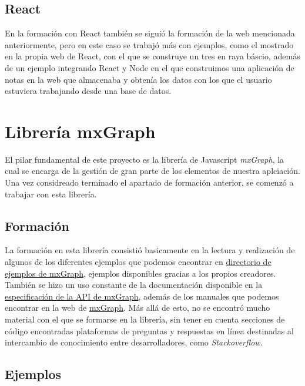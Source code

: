 \subsection{React}

En la formación con React también se siguió la formación de la web mencionada anteriormente, pero en este caso se trabajó más con ejemplos, como el mostrado en la propia web de React, con el que se construye un tres en raya báscio, además de un ejemplo integrando React y Node en el que construimos una aplicación de notas en la web que almacenaba y obtenía los datos con los que el usuario estuviera trabajando desde una base de datos.

\section{Librería mxGraph}

El pilar fundamental de este proyecto es la librería de Javascript \emph{mxGraph}, la cual se encarga de la gestión de gran parte de los elementos de nuestra aplciación. Una vez considreado terminado el apartado de formación anterior, se comenzó a trabajar con esta librería.

\subsection{Formación}

La formación en esta librería consistió basicamente en la lectura y realización de algunos de los diferentes ejemplos que podemos encontrar en \href{https://jgraph.github.io/mxgraph/javascript/}{directorio de ejemplos de mxGraph}, ejemplos disponibles gracias a los propios creadores. También se hizo un uso constante de la documentación disponible en la \href{https://jgraph.github.io/mxgraph/docs/js-api/files/index-txt.html}{especificación de la API de mxGraph}, además de los manuales que podemos encontrar en la web de \href{https://jgraph.github.io/mxgraph/}{mxGraph}. Más allá de esto, no se encontró mucho material con el que se formarse en la librería, sin tener en cuenta secciones de código encontradas plataformas de preguntas y respuestas en línea destinadas al intercambio de conocimiento entre desarrolladores, como \textit{Stackoverflow}.

\subsection{Ejemplos}


